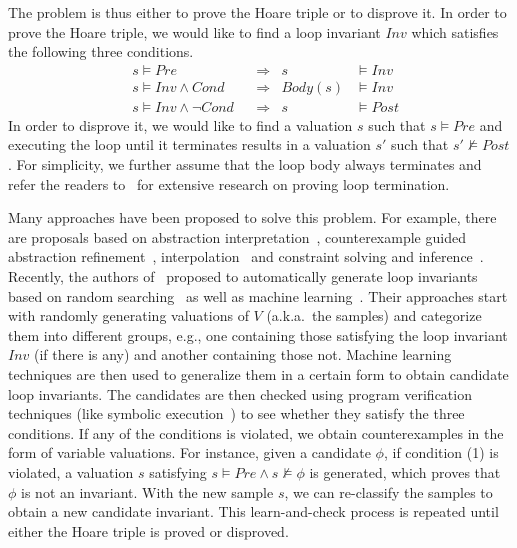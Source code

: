 The problem is thus either to prove the Hoare triple or to disprove it. In order to prove the Hoare triple, we would like to find a loop invariant $\mathit{Inv}$ which satisfies the following three conditions.
\begin{align}
    &s \models \mathit{Pre}
        &&\Longrightarrow & s &\models \mathit{Inv} \label{inv:pre} \\
    &s \models \mathit{Inv} \wedge \mathit{Cond}
        &&\Longrightarrow & \mathit{Body}(s) &\models \mathit{Inv} \label{inv:loop} \\
    &s \models \mathit{Inv} \wedge \neg \mathit{Cond}
        &&\Longrightarrow & s &\models \mathit{Post} \label{inv:post}
\end{align}
In order to disprove it, we would like to find a valuation $s$ such that $s \models \mathit{Pre}$ and executing the loop until it terminates results in a valuation $s'$ such that $s' \not \models \mathit{Post}$. For simplicity, we further assume that the loop body always terminates and refer the readers to~\cite{Domagoj:FAC:2013,LeQC:PLDI:15,Hong:ASE:2015} %
for extensive research on proving loop termination.

Many approaches have been proposed to solve this problem.
For example, there are proposals based on abstraction interpretation~\cite{cousot1978automatic,mine2006octagon,cousot1979systematic,karr1976affine,vincent2009subpolyhedra}, counterexample guided abstraction refinement~\cite{henzinger2003software,thomas2001slam,edmund2003counterexample}, interpolation~\cite{kenneth2010lazy,thomas2004abstractions,kenneth2003interpolation,Kenneth2006lazy} and constraint solving and inference~\cite{ashutosh2009invgen,michael2003linear,sumit2009constraint}.
Recently, the authors of~\cite{sharma2012interpolants,sharma2013verification,DBLP:conf/esop/0001GHALN13,sharma2014invariant} proposed to automatically generate loop invariants based on random searching~\cite{sharma2014invariant} as well as machine learning~\cite{sharma2012interpolants}.
Their approaches start with randomly generating valuations of $V$ (a.k.a.~the samples) and categorize them into different groups, e.g., one containing those satisfying the loop invariant $\mathit{Inv}$ (if there is any) and another containing those not. Machine learning techniques are then used to generalize them in a certain form to obtain candidate loop invariants.
The candidates are then checked using program verification techniques (like symbolic execution~\cite{symbolic}) to see whether they satisfy the three conditions. If any of the conditions is violated, we obtain counterexamples in the form of variable valuations.
For instance, given a candidate $\phi$, if condition (1) is violated, a valuation $s$ satisfying $s {\models} Pre {\land} s {\not \models} \phi$ is generated, which proves that $\phi$ is not an invariant.
With the new sample $s$, we can re-classify the samples to obtain a new candidate invariant. This learn-and-check process is repeated until either the Hoare triple is proved or disproved.

